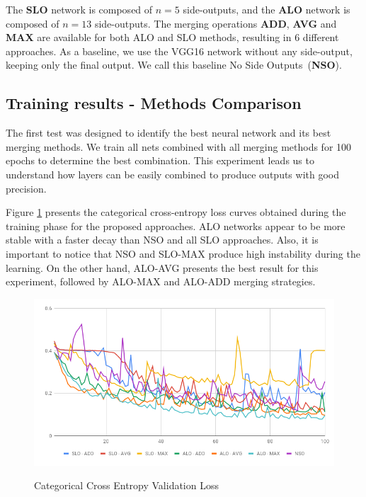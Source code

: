 The \textbf{SLO} network is composed of $n=5$ side-outputs, and the \textbf{ALO} network is composed of $n=13$ side-outputs. 
The merging operations \textbf{ADD}, \textbf{AVG} and \textbf{MAX} are available for both ALO and SLO methods, resulting in 6 different approaches.
As a baseline, we use the VGG16 network without any side-output, keeping only the final output. We call this baseline No Side Outputs~(\textbf{NSO}).

\subsection{Training results - Methods Comparison}

The first test was designed to identify the best neural network and its best merging methods. We train all nets combined with all merging methods for 100 epochs to determine the best combination. This experiment leads us to understand how layers can be easily combined to produce outputs with good precision.

Figure \ref{fig:validation_loss} presents the categorical cross-entropy loss curves obtained during the training phase for the proposed approaches. ALO networks appear to be more stable with a faster decay than NSO and all SLO approaches. Also, it is important to notice that NSO and SLO-MAX produce high instability during the learning. On the other hand, ALO-AVG presents the best result for this experiment, followed by ALO-MAX and ALO-ADD merging strategies.

\begin{figure}
  \caption{Categorical Cross Entropy Validation Loss}
  \centering
    \includegraphics[width=1.\columnwidth]{figures/falreis/validation_loss.png}
  \label{fig:validation_loss}
\end{figure}

